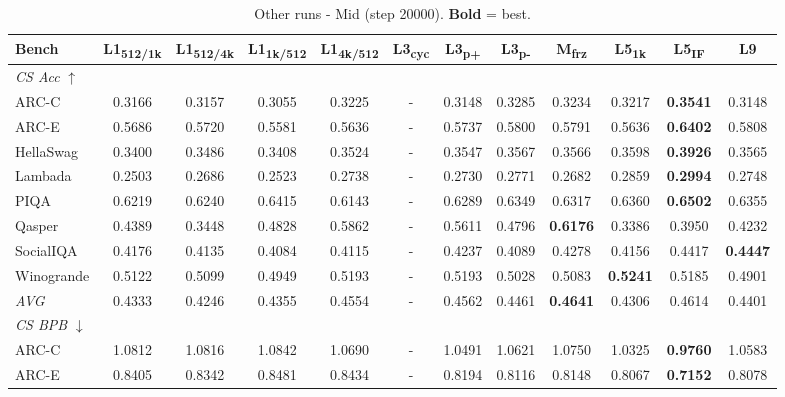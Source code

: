 \begin{table}[htbp]
\centering
\setlength{\tabcolsep}{2.5pt}
\small
\caption{Other runs - Mid (step 20000). \textbf{Bold} = best.}
\label{tab:other_mid}
\begin{tabular}{lccccccccccc}
\toprule
Bench & L1\textsubscript{512/1k} & L1\textsubscript{512/4k} & L1\textsubscript{1k/512} & L1\textsubscript{4k/512} & L3\textsubscript{cyc} & L3\textsubscript{p+} & L3\textsubscript{p-} & M\textsubscript{frz} & L5\textsubscript{1k} & L5\textsubscript{IF} & L9 \\
\midrule
\multicolumn{12}{l}{\textit{CS Acc} $\uparrow$} \\
ARC-C & 0.3166 & 0.3157 & 0.3055 & 0.3225 & - & 0.3148 & 0.3285 & 0.3234 & 0.3217 & \textbf{0.3541} & 0.3148 \\
ARC-E & 0.5686 & 0.5720 & 0.5581 & 0.5636 & - & 0.5737 & 0.5800 & 0.5791 & 0.5636 & \textbf{0.6402} & 0.5808 \\
HellaSwag & 0.3400 & 0.3486 & 0.3408 & 0.3524 & - & 0.3547 & 0.3567 & 0.3566 & 0.3598 & \textbf{0.3926} & 0.3565 \\
Lambada & 0.2503 & 0.2686 & 0.2523 & 0.2738 & - & 0.2730 & 0.2771 & 0.2682 & 0.2859 & \textbf{0.2994} & 0.2748 \\
PIQA & 0.6219 & 0.6240 & 0.6415 & 0.6143 & - & 0.6289 & 0.6349 & 0.6317 & 0.6360 & \textbf{0.6502} & 0.6355 \\
Qasper & 0.4389 & 0.3448 & 0.4828 & 0.5862 & - & 0.5611 & 0.4796 & \textbf{0.6176} & 0.3386 & 0.3950 & 0.4232 \\
SocialIQA & 0.4176 & 0.4135 & 0.4084 & 0.4115 & - & 0.4237 & 0.4089 & 0.4278 & 0.4156 & 0.4417 & \textbf{0.4447} \\
Winogrande & 0.5122 & 0.5099 & 0.4949 & 0.5193 & - & 0.5193 & 0.5028 & 0.5083 & \textbf{0.5241} & 0.5185 & 0.4901 \\
\textit{AVG} & 0.4333 & 0.4246 & 0.4355 & 0.4554 & - & 0.4562 & 0.4461 & \textbf{0.4641} & 0.4306 & 0.4614 & 0.4401 \\
\midrule
\multicolumn{12}{l}{\textit{CS BPB} $\downarrow$} \\
ARC-C & 1.0812 & 1.0816 & 1.0842 & 1.0690 & - & 1.0491 & 1.0621 & 1.0750 & 1.0325 & \textbf{0.9760} & 1.0583 \\
ARC-E & 0.8405 & 0.8342 & 0.8481 & 0.8434 & - & 0.8194 & 0.8116 & 0.8148 & 0.8067 & \textbf{0.7152} & 0.8078 \\

\end{tabular}
\end{table}
